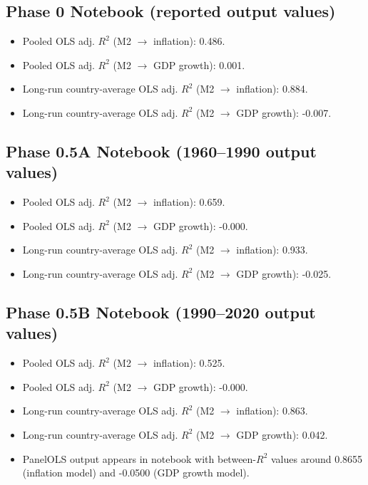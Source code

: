 \documentclass[11pt]{article}
\begin{document}
\subsection{Phase 0 Notebook (reported output values)}
\begin{itemize}
\item Pooled OLS adj. $R^2$ (M2 $\rightarrow$ inflation): 0.486.
\item Pooled OLS adj. $R^2$ (M2 $\rightarrow$ GDP growth): 0.001.
\item Long-run country-average OLS adj. $R^2$ (M2 $\rightarrow$ inflation): 0.884.
\item Long-run country-average OLS adj. $R^2$ (M2 $\rightarrow$ GDP growth): -0.007.
\end{itemize}

\subsection{Phase 0.5A Notebook (1960--1990 output values)}
\begin{itemize}
\item Pooled OLS adj. $R^2$ (M2 $\rightarrow$ inflation): 0.659.
\item Pooled OLS adj. $R^2$ (M2 $\rightarrow$ GDP growth): -0.000.
\item Long-run country-average OLS adj. $R^2$ (M2 $\rightarrow$ inflation): 0.933.
\item Long-run country-average OLS adj. $R^2$ (M2 $\rightarrow$ GDP growth): -0.025.
\end{itemize}

\subsection{Phase 0.5B Notebook (1990--2020 output values)}
\begin{itemize}
\item Pooled OLS adj. $R^2$ (M2 $\rightarrow$ inflation): 0.525.
\item Pooled OLS adj. $R^2$ (M2 $\rightarrow$ GDP growth): -0.000.
\item Long-run country-average OLS adj. $R^2$ (M2 $\rightarrow$ inflation): 0.863.
\item Long-run country-average OLS adj. $R^2$ (M2 $\rightarrow$ GDP growth): 0.042.
\item PanelOLS output appears in notebook with between-$R^2$ values around 0.8655 (inflation model) and -0.0500 (GDP growth model).
\end{itemize}
\end{document}
